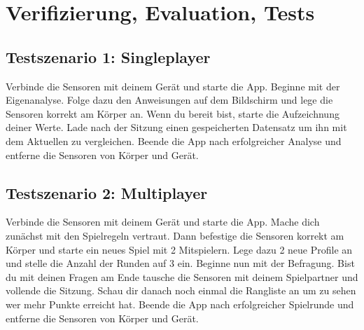 \newpage
\section{Verifizierung, Evaluation, Tests}

\subsection{Testszenario 1: Singleplayer}
Verbinde die Sensoren mit deinem Gerät und starte die App. Beginne mit der Eigenanalyse. Folge dazu den Anweisungen auf dem Bildschirm und lege die Sensoren korrekt am Körper an. Wenn du bereit bist, starte die Aufzeichnung deiner Werte. Lade nach der Sitzung einen gespeicherten Datensatz um ihn mit dem Aktuellen zu vergleichen. Beende die App nach erfolgreicher Analyse und entferne die Sensoren von Körper und Gerät.
\subsection{Testszenario 2: Multiplayer}
Verbinde die Sensoren mit deinem Gerät und starte die App. Mache dich zunächst mit den Spielregeln vertraut. Dann befestige die Sensoren korrekt am Körper und starte ein neues Spiel mit 2 Mitspielern. Lege dazu 2 neue Profile an und stelle die Anzahl der Runden auf 3 ein. Beginne nun mit der Befragung. Bist du mit deinen Fragen am Ende tausche die Sensoren mit deinem Spielpartner und vollende die Sitzung. Schau dir danach noch einmal die Rangliste an um zu sehen wer mehr Punkte erreicht hat. Beende die App nach erfolgreicher Spielrunde und entferne die Sensoren von Körper und Gerät.

